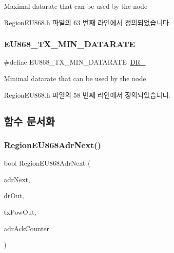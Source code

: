 Maximal datarate that can be used by the node 

Region\+E\+U868.\+h 파일의 63 번째 라인에서 정의되었습니다.

\mbox{\label{group___r_e_g_i_o_n_e_u868_ga2df2a8fc7db7e674c3e58de0dd1c90a4}} 
\subsubsection{\texorpdfstring{E\+U868\+\_\+\+T\+X\+\_\+\+M\+I\+N\+\_\+\+D\+A\+T\+A\+R\+A\+TE}{EU868\_TX\_MIN\_DATARATE}}
{\footnotesize\ttfamily \#define E\+U868\+\_\+\+T\+X\+\_\+\+M\+I\+N\+\_\+\+D\+A\+T\+A\+R\+A\+TE~\mbox{\hyperlink{group___r_e_g_i_o_n_ga6c4ef966b4f3d5eb7597b087f2b97095}{D\+R\+\_}}}

Minimal datarate that can be used by the node 

Region\+E\+U868.\+h 파일의 58 번째 라인에서 정의되었습니다.



\subsection{함수 문서화}
\mbox{\label{group___r_e_g_i_o_n_e_u868_gaa93c92348ce901ace20e766be0be1941}} 
\subsubsection{\texorpdfstring{Region\+E\+U868\+Adr\+Next()}{RegionEU868AdrNext()}}
{\footnotesize\ttfamily bool Region\+E\+U868\+Adr\+Next (\begin{DoxyParamCaption}\item[{\mbox{\hyperlink{group___r_e_g_i_o_n_ga567c2742622326b350b4e91bbf61b4ce}{Adr\+Next\+Params\+\_\+t}} $\ast$}]{adr\+Next,  }\item[{int8\+\_\+t $\ast$}]{dr\+Out,  }\item[{int8\+\_\+t $\ast$}]{tx\+Pow\+Out,  }\item[{uint32\+\_\+t $\ast$}]{adr\+Ack\+Counter }\end{DoxyParamCaption})}



